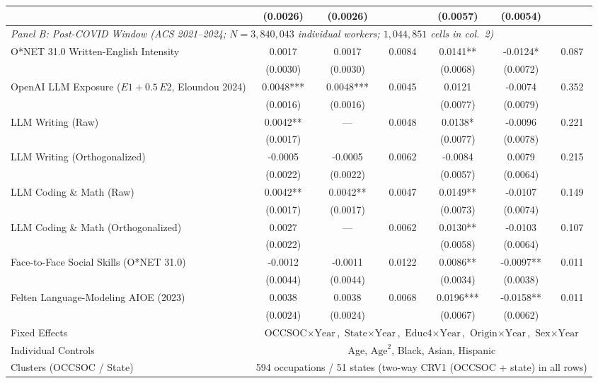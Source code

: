 \begin{table}[htbp]
{\begin{tabular}{lcccccc}
 & (0.0026) & (0.0026) & & (0.0057) & (0.0054) & \\
\midrule
\multicolumn{7}{l}{\textit{Panel B: Post-COVID Window (ACS 2021--2024; $N = 3,840,043$ individual workers; $1,044,851$ cells in col.\ 2)}} \\
\addlinespace[3pt]
O*NET 31.0 Written-English Intensity & 0.0017 & 0.0017 & 0.0084 & 0.0141** & -0.0124* & 0.087 \\
 & (0.0030) & (0.0030) & & (0.0068) & (0.0072) & \\
OpenAI LLM Exposure ($E1 + 0.5\,E2$, Eloundou 2024) & 0.0048*** & 0.0048*** & 0.0045 & 0.0121 & -0.0074 & 0.352 \\
 & (0.0016) & (0.0016) & & (0.0077) & (0.0079) & \\
LLM Writing (Raw) & 0.0042** & --- & 0.0048 & 0.0138* & -0.0096 & 0.221 \\
 & (0.0017) &  & & (0.0077) & (0.0078) & \\
LLM Writing (Orthogonalized) & -0.0005 & -0.0005 & 0.0062 & -0.0084 & 0.0079 & 0.215 \\
 & (0.0022) & (0.0022) & & (0.0057) & (0.0064) & \\
LLM Coding \& Math (Raw) & 0.0042** & 0.0042** & 0.0047 & 0.0149** & -0.0107 & 0.149 \\
 & (0.0017) & (0.0017) & & (0.0073) & (0.0074) & \\
LLM Coding \& Math (Orthogonalized) & 0.0027 & --- & 0.0062 & 0.0130** & -0.0103 & 0.107 \\
 & (0.0022) &  & & (0.0058) & (0.0064) & \\
Face-to-Face Social Skills (O*NET 31.0) & -0.0012 & -0.0011 & 0.0122 & 0.0086** & -0.0097** & 0.011 \\
 & (0.0044) & (0.0044) & & (0.0034) & (0.0038) & \\
Felten Language-Modeling AIOE (2023) & 0.0038 & 0.0038 & 0.0068 & 0.0196*** & -0.0158** & 0.011 \\
 & (0.0024) & (0.0024) & & (0.0067) & (0.0062) & \\
\midrule
Fixed Effects & \multicolumn{6}{c}{$\text{OCCSOC}\times\text{Year}$, $\text{State}\times\text{Year}$, $\text{Educ4}\times\text{Year}$, $\text{Origin}\times\text{Year}$, $\text{Sex}\times\text{Year}$} \\
Individual Controls & \multicolumn{6}{c}{Age, $\text{Age}^2$, Black, Asian, Hispanic} \\
Clusters (OCCSOC / State) & \multicolumn{6}{c}{594 occupations / 51 states (two-way CRV1 (OCCSOC + state) in all rows)} \\

\end{tabular}}
\end{table}
